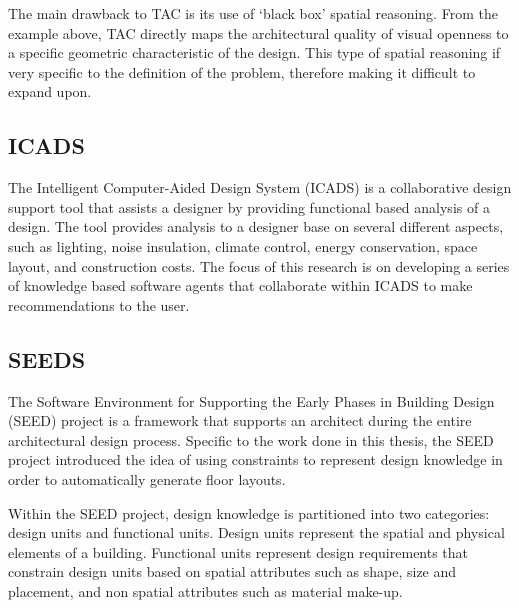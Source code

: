 \documentclass[12pt]{ucthesis}
\begin{document}

The main drawback to TAC is its use of `black box' spatial reasoning. From the example above, TAC directly maps the architectural quality of visual openness to a specific geometric characteristic of the design. This type of spatial reasoning if very specific to the definition of the problem, therefore making it difficult to expand upon. 


\subsection{ICADS}
The Intelligent Computer-Aided Design System (ICADS) \cite{ICADS} is a collaborative design support tool that assists a designer by providing functional based analysis of a design. The tool provides analysis to a designer base on several different aspects, such as lighting, noise insulation, climate control, energy conservation, space layout, and construction costs. The focus of this research is on developing a series of knowledge based software agents that collaborate within ICADS to make recommendations to the user. 

\subsection{SEEDS}
The Software Environment for Supporting the Early Phases in Building Design (SEED) project \cite{SEEDS} is a framework that supports an architect during the entire architectural design process. Specific to the work done in this thesis, the SEED project introduced the idea of using constraints to represent design knowledge in order to automatically generate floor layouts. 

Within the SEED project, design knowledge is partitioned into two categories: design units and functional units. Design units represent the spatial and physical elements of a building. Functional units represent design requirements that constrain design units based on spatial attributes such as shape, size and placement, and non spatial attributes such as material make-up. 
\end{document}
